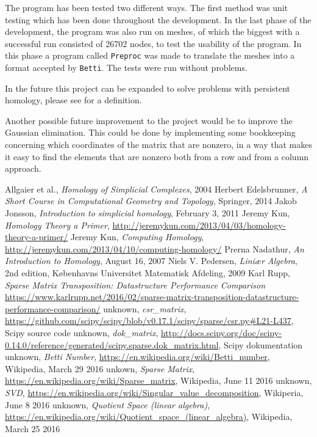 \documentclass[11pt,a4paper,twoside]{report}
\begin{document}
The program has been tested two different ways. The first method was unit testing which has been done throughout the development. In the last phase of the development, the program was also run on meshes, of which the biggest with a successful run consisted of 26702 nodes, to test the usability of the program. In this phase a program called \texttt{Preproc} was made to translate the meshes into a format accepted by \texttt{Betti}. The tests were run without problems.

In the future this project can be expanded to solve problems with persistent homology, please see \cite{Edelsbrunner} for a definition. 

Another possible future improvement to the project would be to improve the Gaussian elimination. This could be done by implementing some bookkeeping concerning which coordinates of the matrix that are nonzero, in a way that makes it easy to find the elements that are nonzero both from a row and from a column approach.



\begin{thebibliography}{9}

 Allgaier et al., \emph{Homology of Simplicial Complexes}, 2004
Herbert Edelsbrunner, \emph{A Short Course in Computational Geometry and Topology}, Springer, 2014
 Jakob Jonsson, \emph{Introduction to simplicial homology}, February 3, 2011
 Jeremy Kun, \emph{Homology Theory a Primer}, \url{http://jeremykun.com/2013/04/03/homology-theory-a-primer/}
 Jeremy Kun, \emph{Computing Homology}, \url{http://jeremykun.com/2013/04/10/computing-homology/}
 Prerna Nadathur, \emph{An Introduction to Homology}, August 16, 2007
 Niels V. Pedersen, \emph{Liniær Algebra}, 2nd edition, Københavns Universitet Matematisk Afdeling, 2009
 Karl Rupp, \emph{Sparse Matrix Transposition: Datastructure Performance Comparison} \url{https://www.karlrupp.net/2016/02/sparse-matrix-transposition-datastructure-performance-comparison/}
 unknown, \emph{csr\_matrix}, \url{https://github.com/scipy/scipy/blob/v0.17.1/scipy/sparse/csr.py#L21-L437}, Scipy source code
 unknown, \emph{dok\_matrix}, \url{http://docs.scipy.org/doc/scipy-0.14.0/reference/generated/scipy.sparse.dok_matrix.html}, Scipy dokumentation
 unknown, \emph{Betti Number}, \url{https://en.wikipedia.org/wiki/Betti_number}, Wikipedia, March 29 2016
 unkown, \emph{Sparse Matrix}, \url{https://en.wikipedia.org/wiki/Sparse_matrix}, Wikipedia, June 11 2016
 unknown, \emph{SVD}, \url{https://en.wikipedia.org/wiki/Singular_value_decomposition}, Wikiperia, June 8 2016
 unknown, \emph{Quotient Space (linear algebra)}, \url{https://en.wikipedia.org/wiki/Quotient_space_(linear_algebra)}, Wikipedia, March 25 2016
\end{thebibliography}
\end{document}
